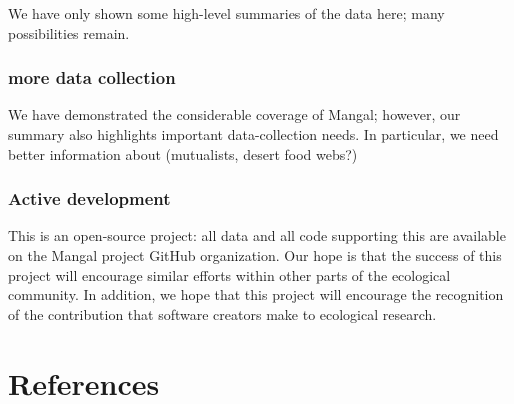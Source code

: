 We have only shown some high-level summaries of the data here; many
possibilities remain.

\hypertarget{more-data-collection}{%
\subsubsection{more data collection}\label{more-data-collection}}

We have demonstrated the considerable coverage of Mangal; however, our
summary also highlights important data-collection needs. In particular,
we need better information about (mutualists, desert food webs?)

\hypertarget{active-development}{%
\subsubsection{Active development}\label{active-development}}

This is an open-source project: all data and all code supporting this
are available on the Mangal project GitHub organization. Our hope is
that the success of this project will encourage similar efforts within
other parts of the ecological community. In addition, we hope that this
project will encourage the recognition of the contribution that software
creators make to ecological research.

\hypertarget{references}{%
\section{References}\label{references}}
